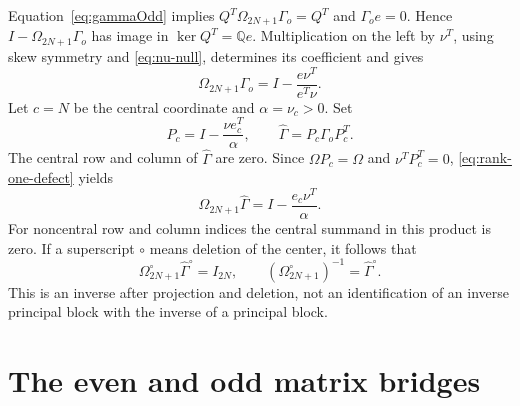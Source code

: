 \documentclass[11pt,a4paper]{amsart}
\theoremstyle{remark}\newtheorem{remark}[theorem]{Remark}
\numberwithin{equation}{section}
\newcommand{\Q}{\mathbb Q}
\begin{document}
Equation~\eqref{eq:gammaOdd} implies $Q^T\Omega_{2N+1}\Gamma_o=Q^T$ and $\Gamma_oe=0$. Hence $I-\Omega_{2N+1}\Gamma_o$ has image in $\ker Q^T=\Q e$. Multiplication on the left by $\nu^T$, using skew symmetry and \eqref{eq:nu-null}, determines its coefficient and gives
\begin{equation}\label{eq:rank-one-defect}
 \Omega_{2N+1}\Gamma_o=I-\frac{e\nu^T}{e^T\nu}.
\end{equation}
Let $c=N$ be the central coordinate and $\alpha=\nu_c>0$. Set
\[
 P_c=I-\frac{\nu e_c^T}{\alpha},\qquad \widehat\Gamma=P_c\Gamma_oP_c^T.
\]
The central row and column of $\widehat\Gamma$ are zero. Since $\Omega P_c=\Omega$ and $\nu^TP_c^T=0$, \eqref{eq:rank-one-defect} yields
\[
 \Omega_{2N+1}\widehat\Gamma=I-\frac{e_c\nu^T}{\alpha}.
\]
For noncentral row and column indices the central summand in this product is zero. If a superscript $\circ$ means deletion of the center, it follows that
\begin{equation}\label{eq:deleted-inverse}
 \Omega_{2N+1}^{\circ}\widehat\Gamma^{\circ}=I_{2N},\qquad
 (\Omega_{2N+1}^{\circ})^{-1}=\widehat\Gamma^{\circ}.
\end{equation}
This is an inverse after projection and deletion, not an identification of an inverse principal block with the inverse of a principal block.

\section{The even and odd matrix bridges}\label{sec:connections}
\end{document}

